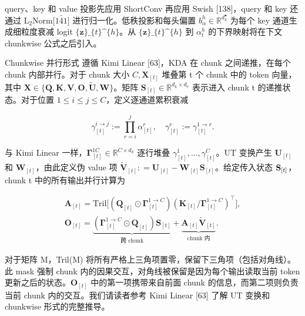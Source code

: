 \documentclass[
  10
]{article}
\begin{document}
query、key 和 value 投影先应用 ShortConv 再应用 Swish {[}138{]}，query 和 key 还通过 \(\mathrm { L _ { 2 } N o r m \bar { \lbrack 1 4 1 \rbrack } }\) 进行归一化。低秩投影和每头偏置 \(b _ { \alpha } ^ { h } \in \mathbb { R } ^ { d _ { k } ^ { \bullet } }\) 为每个 key 通道生成细粒度衰减 logit $ \{ \boldsymbol { z } \} \_ \{ t \} \^{} \{ h \}$。从 $ \{ \boldsymbol { z } \} \_ \{ t \} \^{} \{ h \}$ 到 \(\alpha _ { t } ^ { h }\) 的下界映射将在下文 chunkwise 公式之后引入。

Chunkwise 并行形式 遵循 Kimi Linear {[}63{]}，KDA 在 chunk 之间递推，在每个 chunk 内部并行。对于 chunk 大小 \(C , \mathbf { X } _ { [ t ] }\) 堆叠第 t 个 chunk 中的 token 向量，其中 \(\mathbf { X } \in \{ \mathbf { Q } , \mathbf { K } , \mathbf { V } , \mathbf { O } , \mathbf { \tilde { U } } , \mathbf { W } \}\)。矩阵 \(\mathbf { S } _ { [ t ] } \in \mathbb { R } ^ { d _ { k } \times d _ { v } }\) 表示进入 chunk t 的递推状态。对于位置 \(1 \leq i \leq j \leq C\)，定义逐通道累积衰减

\[
\gamma_ {[ t ]} ^ {i \rightarrow j} := \prod_ {r = i} ^ {j} \alpha_ {[ t ]} ^ {r}, \quad \gamma_ {[ t ]} ^ {r} := \gamma_ {[ t ]} ^ {1 \rightarrow r}.\tag{3}
\]

与 Kimi Linear 一样，\(\mathbf { \Gamma } _ { [ t ] } ^ { 1  C } \in \mathbb { R } ^ { C \times d _ { k } }\) 逐行堆叠 \(\gamma _ { [ t ] } ^ { 1 } , \ldots , \gamma _ { [ t ] } ^ { C }\)。UT 变换产生 \(\mathbf { U } _ { [ t ] }\) 和 \(\mathbf { W } _ { [ t ] }\)，由此定义伪 value 项 \(\widetilde { \mathbf { V } } _ { [ t ] } : = \mathbf { U } _ { [ t ] } - \mathbf { W } _ { [ t ] } \mathbf { S } _ { [ t ] }\)。给定传入状态 \({ \bf S } _ { [ t ] }\)，chunk t 中的所有输出并行计算为

\[
\begin{array}{l} \mathbf {A} _ {[ t ]} = \mathrm{Tril} \Big [ (\mathbf {Q} _ {[ t ]} \odot \mathbf {\Gamma} _ {[ t ]} ^ {1 \to C}) (\mathbf {K} _ {[ t ]} / \mathbf {\Gamma} _ {[ t ]} ^ {1 \to C}) ^ {\top} \Big ], \\ \mathbf {O} _ {[ t ]} = \underbrace {(\mathbf {\Gamma} _ {[ t ]} ^ {1 \to C} \odot \mathbf {Q} _ {[ t ]}) \mathbf {S} _ {[ t ]}} _ {\text {跨 chunk}} + \underbrace {\mathbf {A} _ {[ t ]} \widetilde {\mathbf {V}} _ {[ t ]}} _ {\text {chunk 内}}. \end{array}\tag{4}
\]

对于矩阵 M，Tril(M) 将所有严格上三角项置零，保留下三角项（包括对角线）。此 mask 强制 chunk 内的因果交互，对角线被保留是因为每个输出读取当前 token 更新之后的状态。\(\mathbf { O } _ { [ t ] }\) 中的第一项携带来自前面 chunk 的信息，而第二项则负责当前 chunk 内的交互。我们请读者参考 Kimi Linear {[}63{]} 了解 UT 变换和 chunkwise 形式的完整推导。
\end{document}
